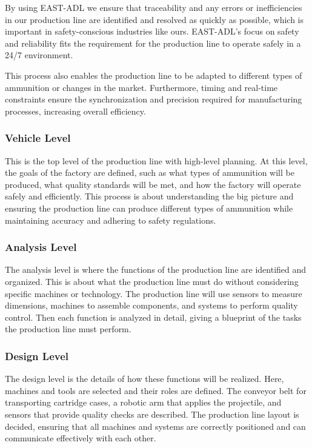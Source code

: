 By using EAST-ADL we ensure that traceability and any errors or inefficiencies in our production line are identified and resolved as quickly as possible, which is important in safety-conscious industries like ours. EAST-ADL’s focus on safety and reliability fits the requirement for the production line to operate safely in a 24/7 environment.

This process also enables the production line to be adapted to different types of ammunition or changes in the market. Furthermore, timing and real-time constraints ensure the synchronization and precision required for manufacturing processes, increasing overall efficiency.

\subsubsection{Vehicle Level}
This is the top level of the production line with high-level planning. At this level, the goals of the factory are defined, such as what types of ammunition will be produced, what quality standards will be met, and how the factory will operate safely and efficiently. This process is about understanding the big picture and ensuring the production line can produce different types of ammunition while maintaining accuracy and adhering to safety regulations.

\subsubsection{Analysis Level}
The analysis level is where the functions of the production line are identified and organized. This is about what the production line must do without considering specific machines or technology. The production line will use sensors to measure dimensions, machines to assemble components, and systems to perform quality control. Then each function is analyzed in detail, giving a blueprint of the tasks the production line must perform.

\subsubsection{Design Level}
The design level is the details of how these functions will be realized. Here, machines and tools are selected and their roles are defined. The conveyor belt for transporting cartridge cases, a robotic arm that applies the projectile, and sensors that provide quality checks are described.
The production line layout is decided, ensuring that all machines and systems are correctly positioned and can communicate effectively with each other.

